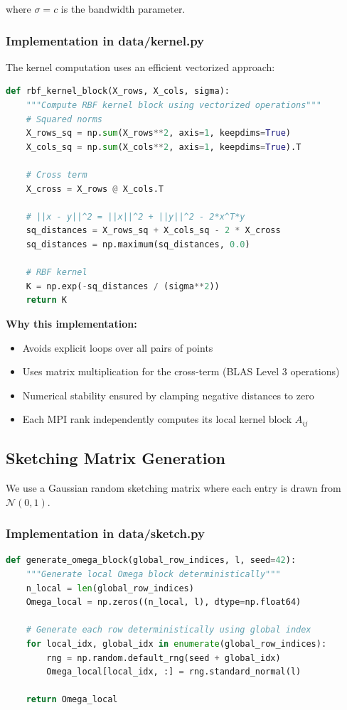 \documentclass[11pt,a4paper]{article}
\begin{document}
where $\sigma = c$ is the bandwidth parameter.

\subsubsection{Implementation in data/kernel.py}

The kernel computation uses an efficient vectorized approach:

\begin{lstlisting}[language=Python, caption={Vectorized RBF kernel computation}]
def rbf_kernel_block(X_rows, X_cols, sigma):
    """Compute RBF kernel block using vectorized operations"""
    # Squared norms
    X_rows_sq = np.sum(X_rows**2, axis=1, keepdims=True)
    X_cols_sq = np.sum(X_cols**2, axis=1, keepdims=True).T
    
    # Cross term
    X_cross = X_rows @ X_cols.T
    
    # ||x - y||^2 = ||x||^2 + ||y||^2 - 2*x^T*y
    sq_distances = X_rows_sq + X_cols_sq - 2 * X_cross
    sq_distances = np.maximum(sq_distances, 0.0)
    
    # RBF kernel
    K = np.exp(-sq_distances / (sigma**2))
    return K
\end{lstlisting}

\textbf{Why this implementation:}
\begin{itemize}
    \item Avoids explicit loops over all pairs of points
    \item Uses matrix multiplication for the cross-term (BLAS Level 3 operations)
    \item Numerical stability ensured by clamping negative distances to zero
    \item Each MPI rank independently computes its local kernel block $A_{ij}$
\end{itemize}

\subsection{Sketching Matrix Generation}

We use a Gaussian random sketching matrix where each entry is drawn from $\mathcal{N}(0, 1)$.

\subsubsection{Implementation in data/sketch.py}

\begin{lstlisting}[language=Python, caption={Deterministic Gaussian sketching matrix generation}]
def generate_omega_block(global_row_indices, l, seed=42):
    """Generate local Omega block deterministically"""
    n_local = len(global_row_indices)
    Omega_local = np.zeros((n_local, l), dtype=np.float64)
    
    # Generate each row deterministically using global index
    for local_idx, global_idx in enumerate(global_row_indices):
        rng = np.random.default_rng(seed + global_idx)
        Omega_local[local_idx, :] = rng.standard_normal(l)
    
    return Omega_local
\end{lstlisting}
\end{document}
